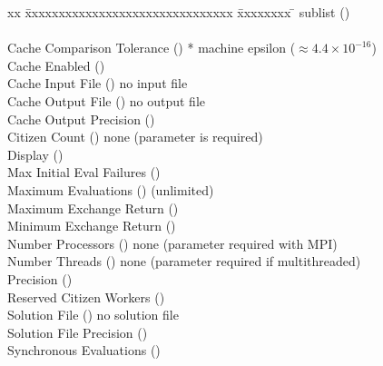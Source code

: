 \begin{tabbing}
  xx \= xxxxxxxxxxxxxxxxxxxxxxxxxxxxxxx \= xxxxxxxx \= \kill
   sublist ()  \\
                 
        \\

  \>Cache Comparison Tolerance         ()
       * machine epsilon ($\approx 4.4 \times 10^{-16}$)  \\
  \>Cache Enabled                      ()
        \\
  \>Cache Input File                   ()
      \>no input file  \\
  \>Cache Output File                  ()
      \>no output file  \\
  \>Cache Output Precision             ()
        \\
  \>Citizen Count                      ()
      \>none (parameter is required)  \\
  \>Display                            ()
        \\
  \>Max Initial Eval Failures          ()
        \\
  \>Maximum Evaluations                ()
       (unlimited)  \\
  \>Maximum Exchange Return            ()
        \\
  \>Minimum Exchange Return            ()
        \\
  \>Number Processors                  ()
      \> none (parameter required with MPI)  \\
  \>Number Threads                     ()
      \> none (parameter required if multithreaded)  \\
  \>Precision                          ()
        \\
  \>Reserved Citizen Workers           ()
        \\
  \>Solution File                      ()
      \>no solution file  \\
  \>Solution File Precision            ()
        \\
  \>Synchronous Evaluations            ()
\end{tabbing}

